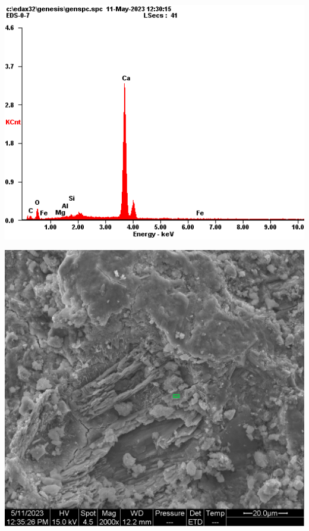 \begin{minipage}{\textwidth}
  \begin{minipage}[b]{0.32\textwidth}
    \centering
    \includegraphics[width = \linewidth]{assets/spectrum/00-07-10000x-ETD-CH.png}
  \end{minipage}
  \hfill
  \begin{minipage}[b]{0.32\textwidth}
    \centering
    \includegraphics[width = \linewidth]{assets/spectrum selection/00-07-02000x-ETD-CH.png}

\end{minipage}
\end{minipage}
